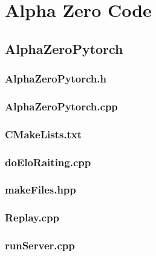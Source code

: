 \documentclass[12pt]{article}
\newcommand{\incFile}[2]{\label{code:#2}\newpage}
\begin{document}
\maketitle
\newpage
\tableofcontents
\newpage
\section{Alpha Zero Code}
\subsection{AlphaZeroPytorch}
\subsubsection{AlphaZeroPytorch.h}							\incFile{C++}{AlphaZeroPytorch/AlphaZeroPytorch.h}
\subsubsection{AlphaZeroPytorch.cpp}						\incFile{C++}{AlphaZeroPytorch/AlphaZeroPytorch.cpp}
\subsubsection{CMakeLists.txt}										\incFile{python}{AlphaZeroPytorch/CMakeLists.txt}
\subsubsection{doEloRaiting.cpp}									\incFile{C++}{AlphaZeroPytorch/doEloRaiting.cpp}
\subsubsection{makeFiles.hpp}										\incFile{C++}{AlphaZeroPytorch/makeFiles.hpp}
\subsubsection{Replay.cpp}											\incFile{C++}{AlphaZeroPytorch/Replay.cpp}
\subsubsection{runServer.cpp}										\incFile{C++}{AlphaZeroPytorch/runServer.cpp}
\end{document}
